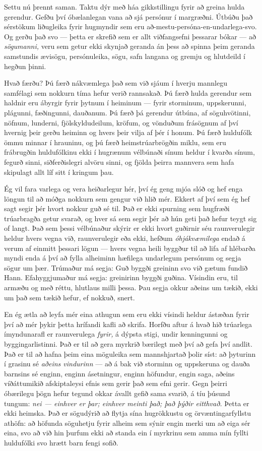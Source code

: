 Settu nú þrennt saman. Taktu dýr með háa gikkstillingu fyrir að greina hulda gerendur. Gefðu því óbælanlegan vana að sjá persónur í margræðni. Útbúðu það sérstökum liðugleika fyrir hugmyndir sem eru að-mestu-persóna-en-undarlega-svo. Og gerðu það svo — þetta er skrefið sem er allt viðfangsefni þessarar bókar — að \emph{sögumanni,} veru sem getur ekki skynjað geranda án þess að spinna þeim geranda samstundis ævisögu, persónuleika, sögu, safn langana og gremju og hlutdeild í hegðun þinni.

Hvað færðu? Þú færð nákvæmlega það sem við sjáum í hverju mannlegu samfélagi sem nokkurn tíma hefur verið rannsakað. Þú færð hulda gerendur sem haldnir eru ábyrgir fyrir þytnum í heiminum — fyrir storminum, uppskerunni, plágunni, fæðingunni, dauðanum. Þú færð þá gerendur útbúna, af söguhvötinni, nöfnum, lunderni, fjölskyldudeilum, kröfum, og vönduðum frásögnum af því hvernig þeir gerðu heiminn og hvers þeir vilja af þér í honum. Þú færð huldufólk ömmu minnar í hrauninu, og þú færð heimstrúarbrögðin miklu, sem eru frábrugðin huldufólkinu ekki í hugrænum vélbúnaði sínum heldur í kvarða sínum, fegurð sinni, siðferðislegri alvöru sinni, og fjölda þeirra mannvera sem hafa skipulagt allt líf sitt í kringum þau.

Ég vil fara varlega og vera heiðarlegur hér, því ég geng mjóa slóð og hef enga löngun til að móðga nokkurn sem gengur við hlið mér. Ekkert af því sem ég hef sagt segir þér hvort nokkur guð sé til. Það er ekki spurning sem hugfræði trúarbragða getur svarað, og hver sá sem segir þér að hún geti það hefur teygt sig of langt. Það sem þessi vélbúnaður skýrir er ekki hvort guðirnir séu raunverulegir heldur hvers vegna við, raunverulegir eða ekki, hefðum \emph{óhjákvæmilega} endað á verum af einmitt þessari lögun — hvers vegna heili byggður til að lifa af hlébarða myndi enda á því að fylla alheiminn hæfilega undarlegum persónum og segja sögur um þær. Trúmaður má segja: Guð byggði greininn svo við gætum fundið Hann. Efahyggjumaður má segja: greinirinn byggði guðina. Vísindin eru, til armæðu og með réttu, hlutlaus milli þessa. Þau segja okkur aðeins um tækið, ekki um það sem tækið hefur, ef nokkuð, snert.

En ég ætla að leyfa mér eina athugun sem eru ekki vísindi heldur ástæðan fyrir því að mér þykir þetta hrífandi kafli að skrifa. Horfðu aftur á hvað hið trúarlega ímyndunarafl er raunverulega \emph{fyrir,} á dýpsta stigi, undir kenningunni og byggingarlistinni. Það er til að gera myrkrið bærilegt með því að gefa því andlit. Það er til að hafna þeim eina möguleika sem mannshjartað þolir síst: að þyturinn í grasinu sé \emph{aðeins vindurinn} — að á bak við storminn og uppskeruna og dauða barnsins sé enginn, enginn ásetningur, enginn höfundur, engin saga, aðeins víðáttumikið afskiptaleysi efnis sem gerir það sem efni gerir. Gegn þeirri óbærilegu þögn hefur tegund okkar ávallt gefið sama svarið, á tíu þúsund tungum: \emph{nei — einhver er þar; einhver meinti það; það þýðir eitthvað.} Þetta er ekki heimska. Það er sögudýrið að flytja sína hugrökkustu og örvæntingarfyllstu athöfn: að höfunda söguhetju fyrir alheim sem sýnir engin merki um að eiga sér eina, svo að við hin þurfum ekki að standa ein í myrkrinu sem amma mín fyllti huldufólki svo hrætt barn fengi sofið.


